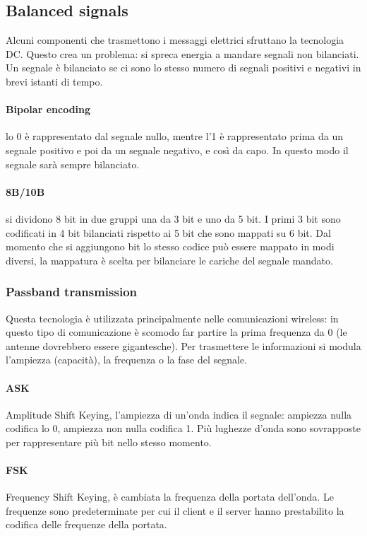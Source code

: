 \documentclass{article}
\begin{document}
\subsection{Balanced signals}
Alcuni componenti che trasmettono i messaggi elettrici sfruttano la tecnologia
DC. Questo crea un problema: si spreca energia a mandare segnali non bilanciati.
Un segnale è bilanciato se ci sono lo stesso numero di segnali positivi e
negativi in brevi istanti di tempo.

\paragraph{Bipolar encoding} lo 0 è rappresentato dal segnale nullo, mentre l'1
è rappresentato prima da un segnale positivo e poi da un segnale negativo, e
così da capo. In questo modo il segnale sarà sempre bilanciato.

\paragraph{8B/10B} si dividono 8 bit in due gruppi una da 3 bit e uno da 5 bit.
I primi 3 bit sono codificati in 4 bit bilanciati rispetto ai 5 bit che sono
mappati su 6 bit. Dal momento che si aggiungono bit lo stesso codice può essere
mappato in modi diversi, la mappatura è scelta per bilanciare le cariche del
segnale mandato.

\subsubsection{Passband transmission}
Questa tecnologia è utilizzata principalmente nelle comunicazioni wireless: in
questo tipo di comunicazione è scomodo far partire la prima frequenza da 0 (le
antenne dovrebbero essere gigantesche). Per trasmettere le informazioni si
modula l'ampiezza (capacità), la frequenza o la fase del segnale.

\paragraph{ASK} Amplitude Shift Keying, l'ampiezza di un'onda indica il segnale:
ampiezza nulla codifica lo 0, ampiezza non nulla codifica 1. Più lughezze d'onda
sono sovrapposte per rappresentare più bit nello stesso momento.

\paragraph{FSK} Frequency Shift Keying, è cambiata la frequenza della portata
dell'onda. Le frequenze sono predeterminate per cui il client e il server hanno
prestabilito la codifica delle frequenze della portata.
\end{document}
